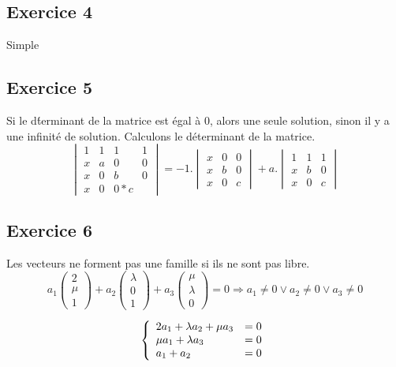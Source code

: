 \documentclass[]{book}
\theoremstyle{definition}
\begin{document}
\subsection*{Exercice 4}
Simple

\subsection*{Exercice 5}
Si le d\'terminant de la matrice est \'egal \`a 0, alors une seule solution, sinon il y a une infinit\'e de solution. Calculons le d\'eterminant de la matrice.
$$
\begin{vmatrix} 1 & 1 & 1 & 1 \\ x & a & 0 & 0 \\ x & 0 & b & 0 \\ x & 0 & 0 * c\end{vmatrix} = 
-1.\begin{vmatrix}  x & 0 & 0 \\ x & b & 0 \\ x & 0 & c \end{vmatrix} + a.\begin{vmatrix}  1 & 1 & 1 \\ x & b & 0 \\ x & 0 & c \end{vmatrix}
$$


\subsection*{Exercice 6}
Les vecteurs ne forment pas une famille si ils ne sont pas libre.
$$
a_1\begin{pmatrix}2\\\mu\\1\end{pmatrix} + a_2\begin{pmatrix}\lambda \\ 0 \\1 \end{pmatrix} + a_3\begin{pmatrix}\mu\\\lambda\\0\end{pmatrix} = 0
\Rightarrow a_1 \neq 0 \lor a_2 \neq 0 \lor a_3 \neq 0$$

$$ 
\left\{ 
\begin{array}{l l}
2a_1 + \lambda a_2 + \mu a_3 & = 0\\
\mu a_1 + \lambda a_3 & = 0\\
a_1 + a_2  & = 0\\
\end{array}
\right. 
$$ 
\end{document}

